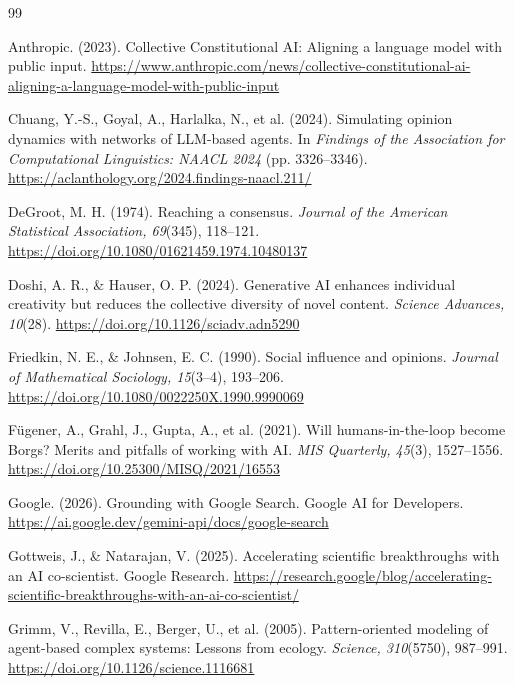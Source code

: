 \documentclass[11pt,a4paper]{article}
\begin{document}
\begingroup
\RaggedRight
\begin{thebibliography}{99}
\RaggedRight
{}

Anthropic. (2023). Collective Constitutional AI: Aligning a language model with public input. \url{https://www.anthropic.com/news/collective-constitutional-ai-aligning-a-language-model-with-public-input}

Chuang, Y.-S., Goyal, A., Harlalka, N., et al. (2024). Simulating opinion dynamics with networks of LLM-based agents. In \textit{Findings of the Association for Computational Linguistics: NAACL 2024} (pp. 3326--3346). \url{https://aclanthology.org/2024.findings-naacl.211/}

DeGroot, M. H. (1974). Reaching a consensus. \textit{Journal of the American Statistical Association, 69}(345), 118--121. \url{https://doi.org/10.1080/01621459.1974.10480137}

Doshi, A. R., \& Hauser, O. P. (2024). Generative AI enhances individual creativity but reduces the collective diversity of novel content. \textit{Science Advances, 10}(28). \url{https://doi.org/10.1126/sciadv.adn5290}

Friedkin, N. E., \& Johnsen, E. C. (1990). Social influence and opinions. \textit{Journal of Mathematical Sociology, 15}(3--4), 193--206. \url{https://doi.org/10.1080/0022250X.1990.9990069}

F\"ugener, A., Grahl, J., Gupta, A., et al. (2021). Will humans-in-the-loop become Borgs? Merits and pitfalls of working with AI. \textit{MIS Quarterly, 45}(3), 1527--1556. \url{https://doi.org/10.25300/MISQ/2021/16553}

Google. (2026). Grounding with Google Search. Google AI for Developers. \url{https://ai.google.dev/gemini-api/docs/google-search}

Gottweis, J., \& Natarajan, V. (2025). Accelerating scientific breakthroughs with an AI co-scientist. Google Research. \url{https://research.google/blog/accelerating-scientific-breakthroughs-with-an-ai-co-scientist/}

Grimm, V., Revilla, E., Berger, U., et al. (2005). Pattern-oriented modeling of agent-based complex systems: Lessons from ecology. \textit{Science, 310}(5750), 987--991. \url{https://doi.org/10.1126/science.1116681}


\end{thebibliography}
\end{document}
